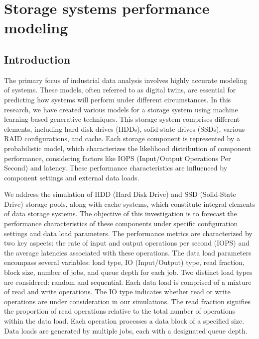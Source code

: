 \section{Storage systems performance modeling}
\subsection{Introduction}
    The primary focus of industrial data analysis involves highly accurate modeling of systems. These models, often referred to as digital twins, are essential for predicting how systems will perform under different circumstances. In this research, we have created various models for a storage system using machine learning-based generative techniques. This storage system comprises different elements, including hard disk drives (HDDs), solid-state drives (SSDs), various RAID configurations, and cache. Each storage component is represented by a probabilistic model, which characterizes the likelihood distribution of component performance, considering factors like IOPS (Input/Output Operations Per Second) and latency. These performance characteristics are influenced by component settings and external data loads.
    
    
    We address the simulation of HDD (Hard Disk Drive) and SSD (Solid-State Drive) storage pools, along with cache systems, which constitute integral elements of data storage systems. The objective of this investigation is to forecast the performance characteristics of these components under specific configuration settings and data load parameters. The performance metrics are characterized by two key aspects: the rate of input and output operations per second (IOPS) and the average latencies associated with these operations. The data load parameters encompass several variables: load type, IO (Input/Output) type, read fraction, block size, number of jobs, and queue depth for each job. Two distinct load types are considered: random and sequential. Each data load is comprised of a mixture of read and write operations. The IO type indicates whether read or write operations are under consideration in our simulations. The read fraction signifies the proportion of read operations relative to the total number of operations within the data load. Each operation processes a data block of a specified size. Data loads are generated by multiple jobs, each with a designated queue depth.
    
